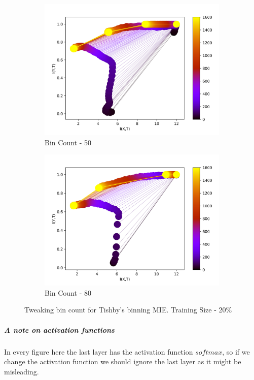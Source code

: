 \documentclass[dissertation.tex]{subfiles}
\begin{document}
\begin{figure}[ht]
\begin{subfigure}[t]{0.24\textwidth}
    \centering
    \includegraphics[width=\textwidth]{figs/eval/binCount/Binning50.png}
    \caption{
      Bin Count - 50
    }
    \label{figBinCount50}
  \end{subfigure}
  \hfill
  \begin{subfigure}[t]{0.24\textwidth}
    \centering
    \includegraphics[width=\textwidth]{figs/eval/binCount/Binning80.png}
    \caption{
      Bin Count - 80
    }
    \label{figBinCount80}
  \end{subfigure}
  \hfill
  \caption{
      Tweaking bin count for Tishby's binning MIE. Training Size - 20\%
    }
  \label{figBinCount}
\end{figure}


\subparagraph{A note on activation functions} In every figure here the last
layer has the activation function $softmax$, so if we change the activation
function we should ignore the last layer as it might be misleading.
\end{document}
